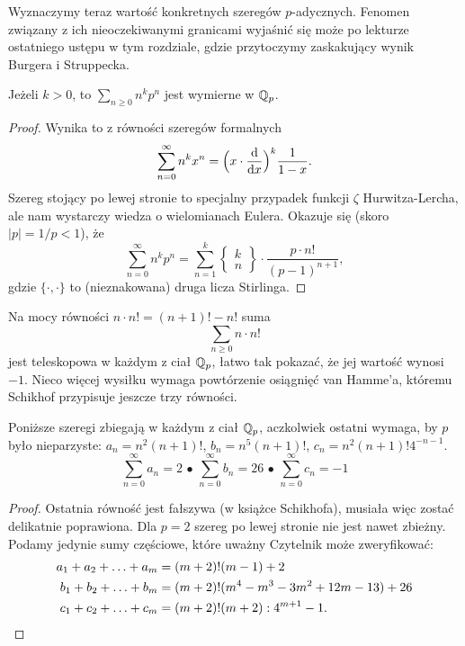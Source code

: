 Wyznaczymy teraz wartość konkretnych szeregów $p$-adycznych.
Fenomen związany z ich nieoczekiwanymi granicami wyjaśnić się może  po lekturze ostatniego ustępu w tym rozdziale, gdzie przytoczymy zaskakujący wynik Burgera i Struppecka.

\begin{fakt}
	Jeżeli  $k > 0$, to $\sum_{n \ge 0} n^k p^n$ jest wymierne w $\mathbb Q_p$.
\end{fakt}

\begin{proof}
	Wynika to z równości szeregów formalnych
	\[
		\sum_{n = 0}^\infty n^k x^n = \Bigl(x \cdot \frac {\textrm{d}}{\textrm{d}x} \Bigr)^k \frac{1}{1-x}.
	\]
	Szereg stojący po lewej stronie to specjalny przypadek funkcji $\zeta$ Hurwitza-Lercha, ale nam wystarczy wiedza o wielomianach Eulera. Okazuje się (skoro $|p| = 1 / p < 1$), że 
	\[
		\sum_{n = 0}^\infty n^k p^n = \sum_{n = 1}^k \left\{\begin{matrix} k \\ n \end{matrix}\right\} \cdot  \frac{p \cdot n!}{(p-1)^{n+1}},
	\]
	gdzie $\{\cdot, \cdot\}$ to (nieznakowana) druga licza Stirlinga.
\end{proof}

Na mocy równości $n \cdot n! = (n+1)! - n!$ suma \[\sum_{n \ge 0} n \cdot n!\]
jest teleskopowa w każdym z ciał $\mathbb Q_p$, łatwo tak pokazać, że jej wartość wynosi $-1$.
Nieco więcej wysiłku wymaga powtórzenie osiągnięć van Hamme'a, któremu Schikhof przypisuje jeszcze trzy równości.

\begin{fakt}
	Poniższe  szeregi zbiegają w każdym z ciał $\mathbb Q_p$, aczkolwiek ostatni wymaga, by $p$ było nieparzyste: $a_n = n^2(n+1)!$, $b_n = n^5(n+1)!$, $c_n = n^2 (n+1)! 4^{-n-1}$.
	 \[
	 	\sum_{n=0}^\infty a_n = 2 \,\bullet\,
	 	\sum_{n=0}^\infty b_n = 26 \,\bullet\,
	 	\sum_{n=0}^\infty c_n = -1
	 \]
\end{fakt}

\begin{proof}
	Ostatnia równość jest fałszywa (w książce Schikhofa), musiała więc zostać delikatnie poprawiona.
	Dla $p = 2$ szereg po lewej stronie nie jest nawet zbieżny.
	Podamy jedynie sumy częściowe, które uważny Czytelnik może zweryfikować:
	\begin{align*}
		a_1 + a_2 + \ldots + a_m &= (m+2)! (m-1) + 2\\
		b_1 + b_2 + \ldots + b_m &= (m+2)! (m^4 - m^3 - 3m^2 +12m-13) + 26\\
		c_1 + c_2 + \ldots + c_m &= (m + 2)! (m + 2) : 4^{m+1} - 1. \qedhere
	\end{align*}
\end{proof}

